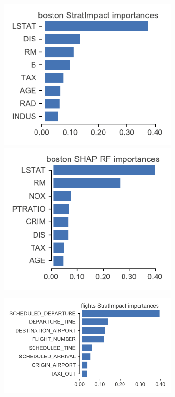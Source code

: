 \documentclass[11pt]{article}
\begin{document}
\begin{figure}
\centering
\begin{subfigure}{1\textwidth}
    \centering
\includegraphics[scale=0.5]{images/boston-features.pdf}
\includegraphics[scale=0.5]{images/boston-features-shap-rf.pdf}
\vspace{-2mm}\vspace{3mm}
\end{subfigure}%
\hfill
\begin{subfigure}{1\textwidth}
    \centering
\includegraphics[scale=0.5]{images/flights-features.pdf}

\end{subfigure}
\end{figure}
\end{document}
